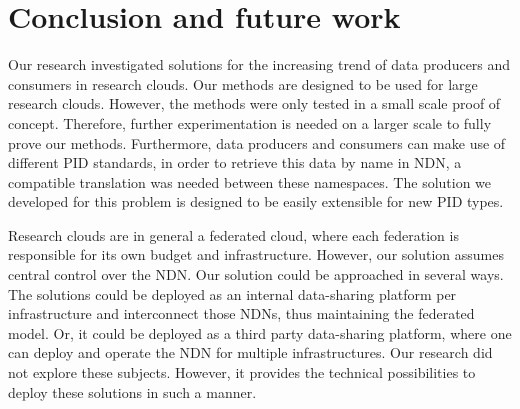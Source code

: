 \section{Conclusion and future work}
\label{fut}
\label{conc}












Our research investigated solutions for the increasing trend of data producers and consumers in research clouds. Our methods are designed to be used for large research clouds. However, the methods were only tested in a small scale proof of concept. Therefore, further experimentation is needed on a larger scale to fully prove our methods. Furthermore, data producers and consumers can make use of different PID standards, in order to retrieve this data by name in NDN, a compatible translation was needed between these namespaces. The solution we developed for this problem is designed to be easily extensible for new PID types. 

Research clouds are in general a federated cloud, where each federation is responsible for its own budget and infrastructure. However, our solution assumes central control over the NDN. Our solution could be approached in several ways. The solutions could be deployed as an internal data-sharing platform per infrastructure and interconnect those NDNs, thus maintaining the federated model. Or, it could be deployed as a third party data-sharing platform, where one can deploy and operate the NDN for multiple infrastructures. Our research did not explore these subjects. However, it provides the technical possibilities to deploy these solutions in such a manner.

